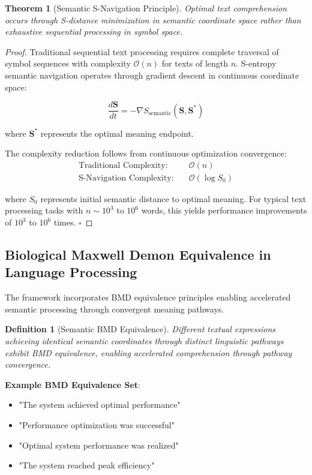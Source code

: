 \documentclass[12pt,a4paper]{article}
\newtheorem{theorem}{Theorem}
\newtheorem{definition}{Definition}
\begin{document}
\begin{theorem}[Semantic S-Navigation Principle]
Optimal text comprehension occurs through S-distance minimization in semantic coordinate space rather than exhaustive sequential processing in symbol space.
\end{theorem}

\begin{proof}
Traditional sequential text processing requires complete traversal of symbol sequences with complexity $\mathcal{O}(n)$ for texts of length $n$. S-entropy semantic navigation operates through gradient descent in continuous coordinate space:

\begin{equation}
\frac{d\mathbf{S}}{dt} = -\nabla S_{\text{semantic}}(\mathbf{S}, \mathbf{S}^*)
\end{equation}

where $\mathbf{S}^*$ represents the optimal meaning endpoint.

The complexity reduction follows from continuous optimization convergence:
\begin{align}
\text{Traditional Complexity:} \quad &\mathcal{O}(n) \\
\text{S-Navigation Complexity:} \quad &\mathcal{O}(\log S_0)
\end{align}

where $S_0$ represents initial semantic distance to optimal meaning. For typical text processing tasks with $n \sim 10^3$ to $10^6$ words, this yields performance improvements of $10^3$ to $10^6$ times. $\square$
\end{proof}

\subsection{Biological Maxwell Demon Equivalence in Language Processing}

The framework incorporates BMD equivalence principles enabling accelerated semantic processing through convergent meaning pathways.

\begin{definition}[Semantic BMD Equivalence]
Different textual expressions achieving identical semantic coordinates through distinct linguistic pathways exhibit BMD equivalence, enabling accelerated comprehension through pathway convergence.
\end{definition}

\textbf{Example BMD Equivalence Set}:
\begin{itemize}
\item "The system achieved optimal performance"
\item "Performance optimization was successful"  
\item "Optimal system performance was realized"
\item "The system reached peak efficiency"
\end{itemize}
\end{document}
